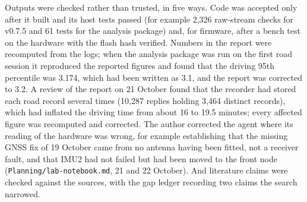 Outputs were checked rather than trusted, in five ways. Code was accepted only after it built and its host tests passed (for example 2,326 raw-stream checks for v0.7.5 and 61 tests for the analysis package) and, for firmware, after a bench test on the hardware with the flash hash verified. Numbers in the report were recomputed from the logs; when the analysis package was run on the first road session it reproduced the reported figures and found that the driving 95th percentile was 3.174, which had been written as 3.1, and the report was corrected to 3.2. A review of the report on 21 October found that the recorder had stored each road record several times (10,287 replies holding 3,464 distinct records), which had inflated the driving time from about 16 to 19.5 minutes; every affected figure was recomputed and corrected. The author corrected the agent where its reading of the hardware was wrong, for example establishing that the missing GNSS fix of 19 October came from no antenna having been fitted, not a receiver fault, and that IMU2 had not failed but had been moved to the front node (\texttt{Planning/lab-notebook.md}, 21 and 22 October). And literature claims were checked against the sources, with the gap ledger recording two claims the search narrowed.
